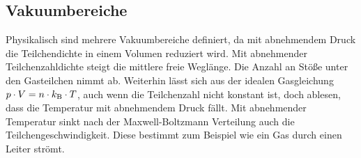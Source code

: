 	\subsection{Vakuumbereiche}

		\noindent
		Physikalisch sind mehrere Vakuumbereiche definiert, da mit abnehmendem Druck die Teilchendichte in einem Volumen reduziert wird.
		Mit abnehmender Teilchenzahldichte steigt die mittlere freie Weglänge. 
		Die Anzahl an Stöße unter den Gasteilchen nimmt ab.
		Weiterhin lässt sich aus der idealen Gasgleichung $p \cdot V = n \cdot k_{\text{B}} \cdot T $, auch wenn die Teilchenzahl nicht konstant ist, doch ablesen, dass die Temperatur mit abnehmendem Druck fällt. 	
		Mit abnehmender Temperatur sinkt nach der Maxwell-Boltzmann Verteilung auch die Teilchengeschwindigkeit.	
		Diese bestimmt zum Beispiel wie ein Gas durch einen Leiter strömt.
		
